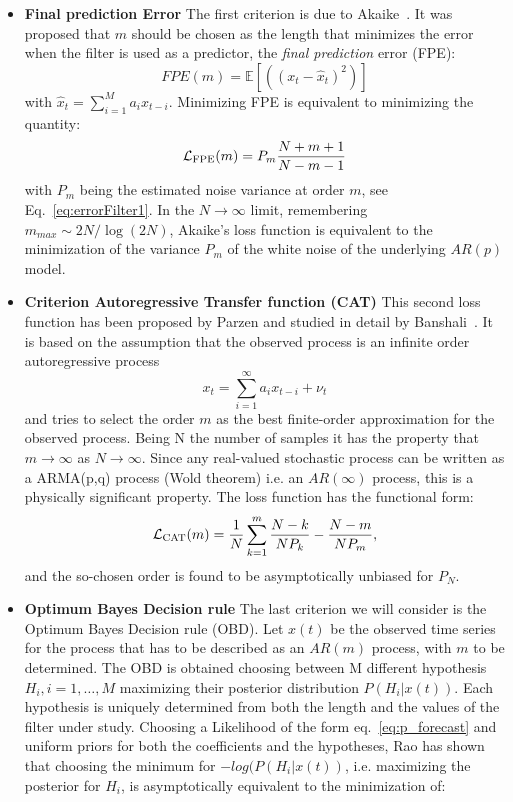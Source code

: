 \documentclass[twocolumn,showpacs,preprintnumbers,nofootinbib,prd,
superscriptaddress,10pt]{revtex4-1}
\begin{document}
\begin{itemize}
\item \textbf{Final prediction Error} 
The first criterion is due to Akaike~\cite{Akaike1970StatisticalPI}. It was proposed that $m$ should be chosen as the 
length that minimizes the error when the filter is used as a predictor, the \emph{final prediction} error (FPE): 
\begin{equation}
    FPE(m) = \mathbb{E}\left[ \left((x_t - \hat x_t) ^ 2\right) \right]
\end{equation}
with $\hat{x}_t = \sum_{i = 1}^M a_i x_{t - i}$.
Minimizing FPE is equivalent to minimizing the quantity: 
\begin{equation}
    \mathcal{L}_{\rm FPE}(m) = P_{m} \frac{N + m + 1}{N - m - 1}
\end{equation}
with $P_m$ being the estimated noise variance at order $m$, see Eq.~\eqref{eq:errorFilter1}. In the $N \to \infty$ limit, 
remembering $m_{max} \sim 2N / \log(2N)$, Akaike's loss function is equivalent to the minimization of the variance $P_m$ of the white noise of the underlying $AR(p)$ model. 

\item \textbf{Criterion Autoregressive Transfer function (CAT)}
This second loss function has been proposed by Parzen and studied in detail by Banshali~\cite{bhansali1986}. 
It is based on the assumption that the observed process is an infinite order autoregressive process 
\begin{equation} 
x_t = \sum_{i = 1}^{\infty}a_{i}x_{t-i} + \nu_t
\end{equation} 
and tries to select the order $m$ as the best finite-order approximation for the observed process. Being N the number of samples it has the property that $m \to \infty$ as $N \to \infty$. Since any real-valued stochastic process can be written as a ARMA(p,q) process (Wold theorem) i.e. an $AR(\infty)$ process, this is a physically significant property. 
The loss function has the functional form: 
\begin{equation}
    \mathcal{L}_{\rm CAT}(m) = \frac{1}{N}\sum_{k = 1}^m \frac{N - k}{N P_k} - \frac{N - m}{N P_m},
\end{equation}
and the so-chosen order is found to be asymptotically unbiased for $P_N$. 

\item \textbf{Optimum Bayes Decision rule} 
The last criterion we will consider is the Optimum Bayes Decision rule (OBD)\cite{doi:10.1029/WR018i004p01097}. Let $x(t)$ be the observed 
time series for the process that has to be described as an $AR(m)$ process, with $m$ to be determined. The OBD is obtained choosing between M different hypothesis $H_i, i = 1, \dots, M$ maximizing their posterior distribution $P(H_i\vert x(t))$. Each
hypothesis is uniquely determined from both the length and the values of the filter under study. Choosing a Likelihood of the form eq.~\eqref{eq:p_forecast} and uniform priors for both the coefficients and the hypotheses, Rao has shown that choosing the minimum for $-log(P(H_i \vert x(t))$, i.e. maximizing the posterior for $H_i$, is asymptotically equivalent to the minimization of:


\end{itemize}
\end{document}
